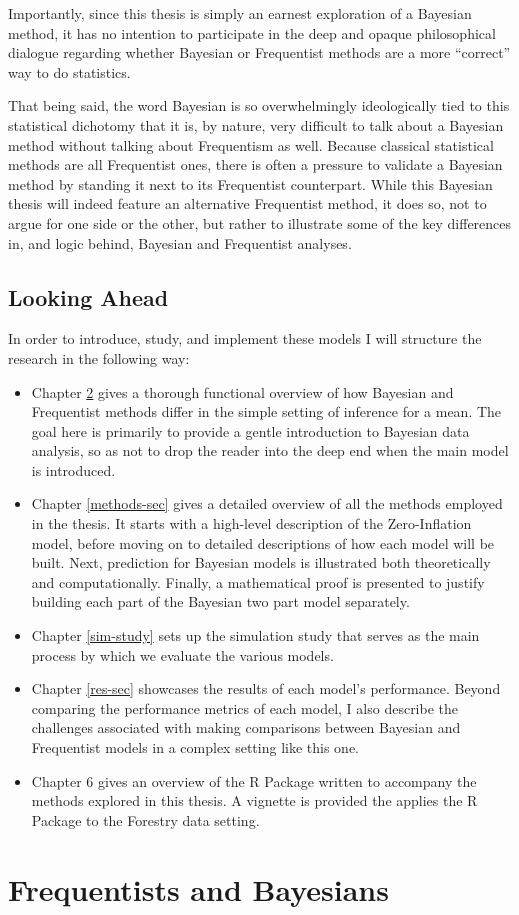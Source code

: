 \documentclass[12pt,twoside]{reedthesis}
\begin{document}
Importantly, since this thesis is simply an earnest exploration of a Bayesian method, it has no intention to participate in the deep and opaque philosophical dialogue regarding whether Bayesian or Frequentist methods are a more ``correct'' way to do statistics.

That being said, the word Bayesian is so overwhelmingly ideologically tied to this statistical dichotomy that it is, by nature, very difficult to talk about a Bayesian method without talking about Frequentism as well. Because classical statistical methods are all Frequentist ones, there is often a pressure to validate a Bayesian method by standing it next to its Frequentist counterpart. While this Bayesian thesis will indeed feature an alternative Frequentist method, it does so, not to argue for one side or the other, but rather to illustrate some of the key differences in, and logic behind, Bayesian and Frequentist analyses.

\hypertarget{looking-ahead}{%
\section{Looking Ahead}\label{looking-ahead}}

In order to introduce, study, and implement these models I will structure the research in the following way:
\begin{itemize}
\item
  Chapter \ref{bayes-freq} gives a thorough functional overview of how Bayesian and Frequentist methods differ in the simple setting of inference for a mean. The goal here is primarily to provide a gentle introduction to Bayesian data analysis, so as not to drop the reader into the deep end when the main model is introduced.
\item
  Chapter \ref{methods-sec} gives a detailed overview of all the methods employed in the thesis. It starts with a high-level description of the Zero-Inflation model, before moving on to detailed descriptions of how each model will be built. Next, prediction for Bayesian models is illustrated both theoretically and computationally. Finally, a mathematical proof is presented to justify building each part of the Bayesian two part model separately.
\item
  Chapter \ref{sim-study} sets up the simulation study that serves as the main process by which we evaluate the various models.
\item
  Chapter \ref{res-sec} showcases the results of each model's performance. Beyond comparing the performance metrics of each model, I also describe the challenges associated with making comparisons between Bayesian and Frequentist models in a complex setting like this one.
\item
  Chapter 6 gives an overview of the R Package written to accompany the methods explored in this thesis. A vignette is provided the applies the R Package to the Forestry data setting.
\end{itemize}
\hypertarget{bayes-freq}{%
\chapter{Frequentists and Bayesians}\label{bayes-freq}}
\end{document}
